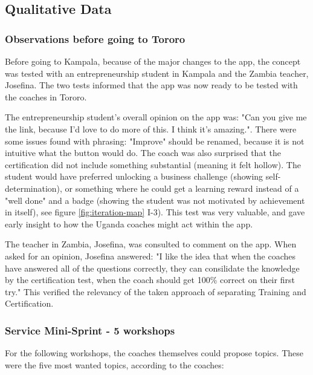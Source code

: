 \subsection{Qualitative Data}


  \subsubsection{Observations before going to Tororo}
  Before going to Kampala, because of the major changes to the app, the concept was tested with an entrepreneurship student in Kampala and the Zambia teacher, Josefina. The two tests informed that the app was now ready to be tested with the coaches in Tororo.

  The entrepreneurship student's overall opinion on the app was: "Can you give me the link, because I'd love to do more of this. I think it's amazing.". There were some issues found with phrasing: "Improve" should be renamed, because it is not intuitive what the button would do. The coach was also surprised that the certification did not include something substantial (meaning it felt hollow). The student would have preferred unlocking a business challenge (showing self-determination), or something where he could get a learning reward instead of a "well done" and a badge (showing the student was not motivated by achievement in itself), see figure \ref{fig:iteration-map} I-3). This test was very valuable, and gave early insight to how the Uganda coaches might act within the app.

  The teacher in Zambia, Josefina, was consulted to comment on the app. When asked for an opinion, Josefina answered: "I like the idea that when the coaches have answered all of the questions correctly, they can consilidate the knowledge by the certification test, when the coach should get 100\% correct on their first try." This verified the relevancy of the taken approach of separating Training and Certification.

  \subsubsection{Service Mini-Sprint - 5 workshops}

  For the following workshops, the coaches themselves could propose topics. These were the five most wanted topics, according to the coaches:

